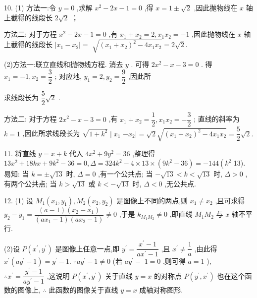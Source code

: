 10. (1) 方法一:令 $y = 0$ ,求解 ${x}^{2} - {2x} - 1 = 0$ ,得 $x = 1 \pm  \sqrt{2}$ ,因此抛物线在 $x$ 轴上截得的线段长 $2\sqrt{2}$ ；

方法二: 对于方程 ${x}^{2} - {2x} - 1 = 0$ ,有 ${x}_{1} + {x}_{2} = 2,{x}_{1}{x}_{2} =  - 1$ ,因此抛物线在 $x$ 轴上截得的线段长 $\left| {{x}_{1} - {x}_{2}}\right|  =$  $\sqrt{{\left( {x}_{1} + {x}_{2}\right) }^{2} - 4{x}_{1}{x}_{2}} = 2\sqrt{2}.$

(2)方法一:联立直线和抛物线方程. 消去 $y$ . 可得 $2{x}^{2} - x - 3 = 0$ . 得 ${x}_{1} =  - 1,{x}_{2} = \dfrac{3}{2}$ ; 对应地, ${y}_{1} = 2,{y}_{2} = \dfrac{9}{2}$ ,因此所

求线段长为 $\dfrac{5}{2}\sqrt{2}$ .

方法二: 对于方程 $2{x}^{2} - x - 3 = 0$ ,有 ${x}_{1} + {x}_{2} = \dfrac{1}{2},{x}_{1}{x}_{2} =  - \dfrac{3}{2}$ ; 直线的斜率为 $k = 1$ ,因此所求线段长为 $\sqrt{1 + {k}^{2}} \mid  {x}_{1}$  $- {x}_{2} \mid   = \sqrt{2}\sqrt{{\left( {x}_{1} + {x}_{2}\right) }^{2} - 4{x}_{1}{x}_{2}} = \dfrac{5}{2}\sqrt{2}.$

11. 将直线 $y = x + k$ 代入 $4{x}^{2} + 9{y}^{2} = {36}$ ,整理得 ${13}{x}^{2} + {18kx} + 9{k}^{2} - {36} = 0,\Delta  = {324}{k}^{2} - 4 \times  {13} \times  \left( {9{k}^{2} - {36}}\right)  =  - {144}\left( {k}^{2}\right.$ 13). 易知: 当 $k =  \pm  \sqrt{13}$ 时, $\Delta  = 0$ ,有一个公共点; 当 $- \sqrt{13} < k < \sqrt{13}$ 时, $\Delta  > 0$ ,有两个公共点; 当 $k > \sqrt{13}$ 或 $k <  - \sqrt{13}$ 时, $\Delta  < 0$ ,无公共点.

12. (1) 设 ${M}_{1}\left( {{x}_{1},{y}_{1}}\right) ,{M}_{2}\left( {{x}_{2},{y}_{2}}\right)$ 是图像上不同的两点,则 ${x}_{1} \neq  {x}_{2}$ ,且可求得 ${y}_{2} - {y}_{1} = \dfrac{\left( {a - 1}\right) \left( {{x}_{2} - {x}_{1}}\right) }{\left( {a{x}_{1} - 1}\right) \left( {a{x}_{2} - 1}\right) } \neq  0$ ,于是 ${k}_{{M}_{1}{M}_{2}} \neq  0$ ,即直线 ${M}_{1}{M}_{2}$ 与 $x$ 轴不平行.

(2)设 $P\left( {{x}^{\prime },{y}^{\prime }}\right)$ 是图像上任意一点,即 ${y}^{\prime } = \dfrac{{x}^{\prime } - 1}{a{x}^{\prime } - 1}$ ,且 ${x}^{\prime } \neq  \dfrac{1}{a}$ ,由此得 ${x}^{\prime }\left( {a{y}^{\prime } - 1}\right)  = {y}^{\prime } - 1.\;\because a{y}^{\prime } - 1 \neq  0$ (若 $a{y}^{\prime } -$  $1 = 0$ ,则可得 $a = 1$ ), $\therefore {x}^{\prime } = \dfrac{{y}^{\prime } - 1}{a{y}^{\prime } - 1}$ ,这说明 $P\left( {{x}^{\prime },{y}^{\prime }}\right)$ 关于直线 $y = x$ 的对称点 $P\left( {{y}^{\prime },{x}^{\prime }}\right)$ 也在这个函数的图像上, $\therefore$ 此函数的图像关于直线 $y = x$ 成轴对称图形.

